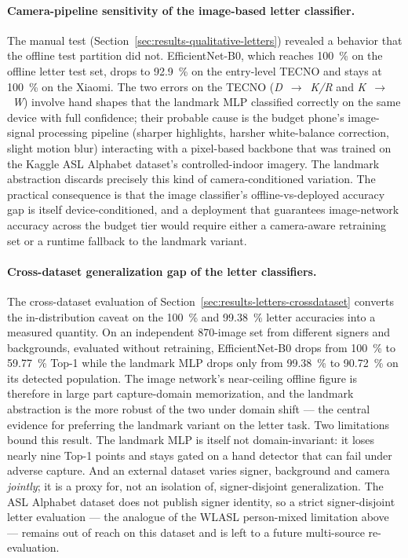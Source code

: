 \paragraph{Camera-pipeline sensitivity of the image-based letter
classifier.}
The manual test
(Section~\ref{sec:results-qualitative-letters}) revealed a behavior
that the offline test partition did not. EfficientNet-B0, which
reaches \SI{100}{\percent} on the offline letter test set, drops to
\SI{92.9}{\percent} on the entry-level TECNO and stays at
\SI{100}{\percent} on the Xiaomi. The two errors on the TECNO
(\textit{D}~$\rightarrow$~\textit{K/R} and
\textit{K}~$\rightarrow$~\textit{W}) involve hand shapes that the
landmark MLP classified correctly on the same device with full
confidence; their probable cause is the budget phone's image-signal
processing pipeline (sharper highlights, harsher white-balance
correction, slight motion blur) interacting with a pixel-based
backbone that was trained on the Kaggle ASL Alphabet dataset's
controlled-indoor imagery. The landmark abstraction discards
precisely this kind of camera-conditioned variation. The practical
consequence is that the image classifier's offline-vs-deployed
accuracy gap is itself device-conditioned, and a deployment that
guarantees image-network accuracy across the budget tier would
require either a camera-aware retraining set or a runtime fallback
to the landmark variant.

\paragraph{Cross-dataset generalization gap of the letter
classifiers.}
The cross-dataset evaluation of
Section~\ref{sec:results-letters-crossdataset} converts the
in-distribution caveat on the \SI{100}{\percent} and
\SI{99.38}{\percent} letter accuracies into a measured quantity. On
an independent \num{870}-image set from different signers and
backgrounds, evaluated without retraining, EfficientNet-B0 drops from
\SI{100}{\percent} to \SI{59.77}{\percent} Top-1 while the landmark
MLP drops only from \SI{99.38}{\percent} to \SI{90.72}{\percent} on
its detected population. The image network's near-ceiling offline
figure is therefore in large part capture-domain memorization, and
the landmark abstraction is the more robust of the two under domain
shift --- the central evidence for preferring the landmark variant on
the letter task. Two limitations bound this result. The landmark MLP
is itself not domain-invariant: it loses nearly nine Top-1 points and
stays gated on a hand detector that can fail under adverse capture.
And an external dataset varies signer, background and camera
\emph{jointly}; it is a proxy for, not an isolation of,
signer-disjoint generalization. The ASL Alphabet dataset does not
publish signer identity, so a strict signer-disjoint letter
evaluation --- the analogue of the WLASL person-mixed limitation
above --- remains out of reach on this dataset and is left to a
future multi-source re-evaluation.

